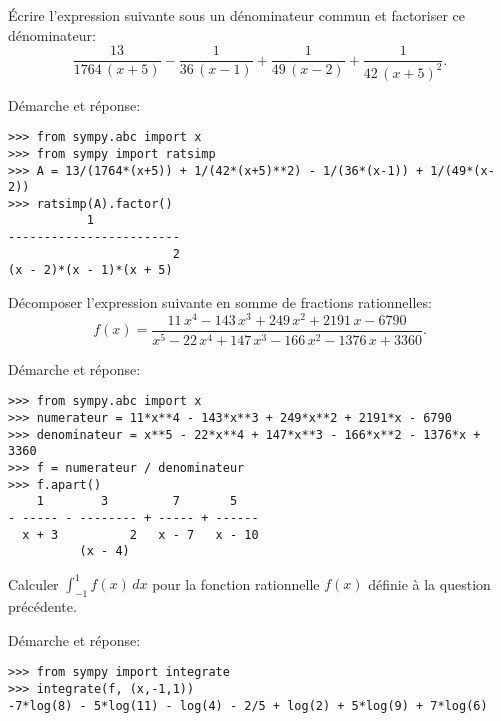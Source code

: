 \begin{question}[1 pts]
    Écrire l'expression suivante sous un dénominateur commun et factoriser ce
    dénominateur:
\[
    \frac{13}{1764 \, {\left(x + 5\right)}} - \frac{1}{36 \, {\left(x -
    1\right)}} + \frac{1}{49 \, {\left(x - 2\right)}} + \frac{1}{42 \,
    {\left(x + 5\right)}^{2}}.
\]
\begin{mybox}
Démarche et réponse:
\begin{reponse}
\begin{verbatim}
>>> from sympy.abc import x
>>> from sympy import ratsimp
>>> A = 13/(1764*(x+5)) + 1/(42*(x+5)**2) - 1/(36*(x-1)) + 1/(49*(x-2))
>>> ratsimp(A).factor()
           1
------------------------
                       2
(x - 2)*(x - 1)*(x + 5)
\end{verbatim}
\end{reponse}
\end{mybox}
\end{question}



\begin{question}[1 pts]
Décomposer l'expression suivante en somme de fractions rationnelles:
\[
    f(x) = \frac{11 \, x^{4} - 143 \, x^{3} + 249 \, x^{2} + 2191 \, x -
    6790}{x^{5} - 22 \, x^{4} + 147 \, x^{3} - 166 \, x^{2} - 1376 \, x +
    3360}.
\]
\begin{mybox}
Démarche et réponse:
\begin{reponse}
\begin{verbatim}
>>> from sympy.abc import x
>>> numerateur = 11*x**4 - 143*x**3 + 249*x**2 + 2191*x - 6790
>>> denominateur = x**5 - 22*x**4 + 147*x**3 - 166*x**2 - 1376*x + 3360
>>> f = numerateur / denominateur
>>> f.apart()
    1        3         7       5
- ----- - -------- + ----- + ------
  x + 3          2   x - 7   x - 10
          (x - 4)
\end{verbatim}
\end{reponse}
\end{mybox}
\end{question}


\begin{question}[1 pts]
Calculer $\int_{-1}^1 f(x) \,dx$ pour la fonction rationnelle $f(x)$ définie à
la question précédente.
\begin{mybox}
Démarche et réponse:
\begin{reponse}
\begin{verbatim}
>>> from sympy import integrate
>>> integrate(f, (x,-1,1))
-7*log(8) - 5*log(11) - log(4) - 2/5 + log(2) + 5*log(9) + 7*log(6)
\end{verbatim}
\end{reponse}
\end{mybox}
\end{question}


